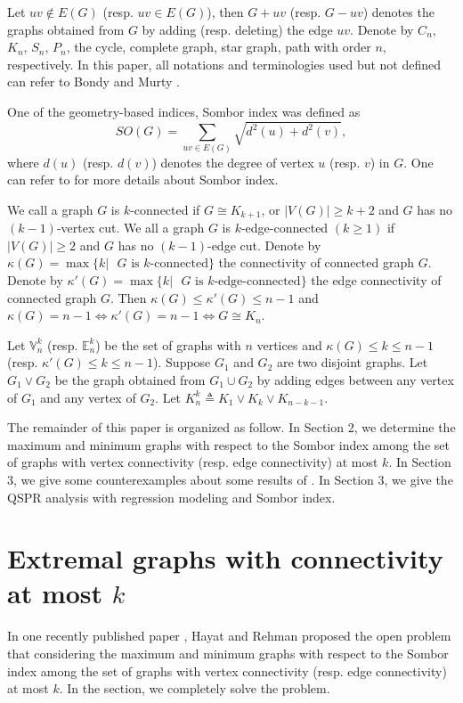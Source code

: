 \documentclass[a4paper,12pt]{article}
\begin{document}
Let $uv\notin E(G)$ (resp. $uv\in E(G)$), then $G+uv$ (resp. $G-uv$) denotes the graphs obtained from $G$ by adding (resp. deleting) the edge $uv$.
Denote by $C_{n}$, $K_{n}$, $S_{n}$, $P_{n}$, the cycle, complete graph, star graph, path with order $n$, respectively.
In this paper, all notations and terminologies used but not defined can refer to Bondy and Murty \cite{bond2008}.




One of the geometry-based indices, Sombor index \cite{gumn2021} was defined as
$$SO(G)=\sum_{uv\in E(G)}\sqrt{d^{2}(u)+d^{2}(v)},$$
where $d(u)$ (resp. $d(v)$) denotes the degree of vertex $u$ (resp. $v$) in $G$.
One can refer to \cite{rirm2021,chli2021,dengt2021,giva2021,guma2021,lizh2022} for more details about Sombor index.


We call a graph $G$ is $k$-connected if $G\cong K_{k+1}$, or $|V(G)|\geq k+2$ and $G$ has no $(k-1)$-vertex cut.
We all a graph $G$ is $k$-edge-connected $(k\geq 1)$ if $|V(G)|\geq 2$ and $G$ has no $(k-1)$-edge cut.
Denote by $\kappa(G)=\max\{k| \text{ $G$ is $k$-connected}\}$ the connectivity of connected graph $G$.
Denote by $\kappa'(G)=\max\{k| \text{ $G$ is $k$-edge-connected}\}$ the edge connectivity of connected graph $G$. Then $\kappa(G)\leq \kappa'(G)\leq n-1$ and $\kappa(G)=n-1\Leftrightarrow \kappa'(G)=n-1\Leftrightarrow G\cong K_{n}$.

Let $\mathbb{V}_{n}^{k}$ (resp. $\mathbb{E}_{n}^{k}$) be the set of graphs with $n$ vertices and $\kappa(G)\leq k\leq n-1$ (resp. $\kappa'(G)\leq k\leq n-1$).
Suppose $G_{1}$ and $G_{2}$ are two disjoint graphs. Let $G_{1}\vee G_{2}$ be the graph obtained from $G_{1}\cup G_{2}$ by adding edges between any vertex of $G_{1}$ and any vertex of $G_{2}$.
Let $K_{n}^{k}\triangleq K_{1}\vee K_{k}\vee K_{n-k-1}$.


The remainder of this paper is organized as follow. In Section 2, we determine the maximum and minimum graphs with respect to the Sombor index among the set of graphs with vertex connectivity (resp. edge connectivity) at most $k$.
In Section 3, we give some counterexamples about some results of \cite{hare2023}.
In Section 3, we give the QSPR analysis with regression modeling and Sombor index.



\section{Extremal graphs with connectivity at most $k$}
\hskip 0.6cm
In one recently published paper \cite{hare2023}, Hayat and Rehman proposed the open problem that considering the maximum and minimum graphs with respect to the Sombor index among the set of graphs with vertex connectivity (resp. edge connectivity) at most $k$. In the section, we completely solve the problem.
\end{document}

